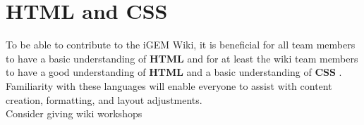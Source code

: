 
\section{HTML and CSS  }
To be able to contribute to the iGEM Wiki, it is beneficial for all team members to have a basic understanding  of \textbf{HTML} and for at least the wiki team members to have a good understanding of \textbf{HTML} and a basic understanding of \textbf{CSS }.
Familiarity with these languages will enable everyone to assist with content creation, formatting, and layout
adjustments. \\ \newline
Consider giving wiki workshops